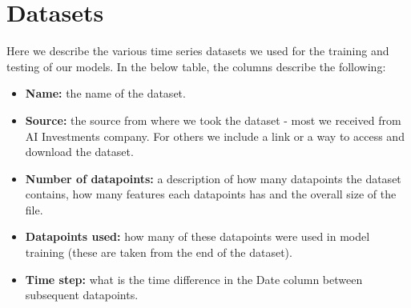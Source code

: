 \section{Datasets}
Here we describe the various time series datasets we used for the training and testing of our models. In the below table, the columns describe the following:
\begin{itemize}
	\item \textbf{Name:} the name of the dataset.
	\item \textbf{Source:} the source from where we took the dataset - most we received from AI Investments company. For others we include a link or a way to access and download the dataset.
	\item \textbf{Number of datapoints:} a description of how many datapoints the dataset contains, how many features each datapoints has and the overall size of the file.
	\item \textbf{Datapoints used:} how many of these datapoints were used in model training (these are taken from the end of the dataset).
	\item \textbf{Time step:} what is the time difference in the Date column between subsequent datapoints.
\end{itemize}




